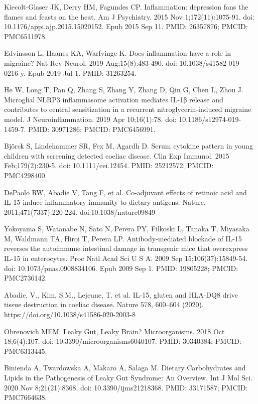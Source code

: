 \documentclass{article}
\begin{document}
\begin{thebibliography}{9}
Kiecolt-Glaser JK, Derry HM, Fagundes CP. Inflammation: depression fans the flames and feasts on the heat. Am J Psychiatry. 2015 Nov 1;172(11):1075-91. doi: 10.1176/appi.ajp.2015.15020152. Epub 2015 Sep 11. PMID: 26357876; PMCID: PMC6511978.

Edvinsson L, Haanes KA, Warfvinge K. Does inflammation have a role in migraine? Nat Rev Neurol. 2019 Aug;15(8):483-490. doi: 10.1038/s41582-019-0216-y. Epub 2019 Jul 1. PMID: 31263254.

He W, Long T, Pan Q, Zhang S, Zhang Y, Zhang D, Qin G, Chen L, Zhou J. Microglial NLRP3 inflammasome activation mediates IL-1β release and contributes to central sensitization in a recurrent nitroglycerin-induced migraine model. J Neuroinflammation. 2019 Apr 10;16(1):78. doi: 10.1186/s12974-019-1459-7. PMID: 30971286; PMCID: PMC6456991.

Björck S, Lindehammer SR, Fex M, Agardh D. Serum cytokine pattern in young children with screening detected coeliac disease. Clin Exp Immunol. 2015 Feb;179(2):230-5. doi: 10.1111/cei.12454. PMID: 25212572; PMCID: PMC4298400.

DePaolo RW, Abadie V, Tang F, et al. Co-adjuvant effects of retinoic acid and IL-15 induce inflammatory immunity to dietary antigens. Nature. 2011;471(7337):220-224. doi:10.1038/nature09849

Yokoyama S, Watanabe N, Sato N, Perera PY, Filkoski L, Tanaka T, Miyasaka M, Waldmann TA, Hiroi T, Perera LP. Antibody-mediated blockade of IL-15 reverses the autoimmune intestinal damage in transgenic mice that overexpress IL-15 in enterocytes. Proc Natl Acad Sci U S A. 2009 Sep 15;106(37):15849-54. doi: 10.1073/pnas.0908834106. Epub 2009 Sep 1. PMID: 19805228; PMCID: PMC2736142.

Abadie, V., Kim, S.M., Lejeune, T. et al. IL-15, gluten and HLA-DQ8 drive tissue destruction in coeliac disease. Nature 578, 600–604 (2020). https://doi.org/10.1038/s41586-020-2003-8

Obrenovich MEM. Leaky Gut, Leaky Brain? Microorganisms. 2018 Oct 18;6(4):107. doi: 10.3390/microorganisms6040107. PMID: 30340384; PMCID: PMC6313445.

Binienda A, Twardowska A, Makaro A, Salaga M. Dietary Carbohydrates and Lipids in the Pathogenesis of Leaky Gut Syndrome: An Overview. Int J Mol Sci. 2020 Nov 8;21(21):8368. doi: 10.3390/ijms21218368. PMID: 33171587; PMCID: PMC7664638.


\end{thebibliography}
\end{document}

